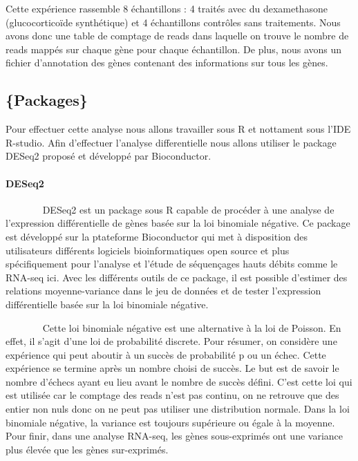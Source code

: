 \documentclass[
  12pt,
]{article}
\begin{document}
\par

Cette expérience rassemble 8 échantillons : 4 traités avec du
dexamethasone (glucocorticoïde synthétique) et 4 échantillons contrôles
sans traitements. Nous avons donc une table de comptage de reads dans
laquelle on trouve le nombre de reads mappés sur chaque gène pour chaque
échantillon. De plus, nous avons un fichier d'annotation des gènes
contenant des informations sur tous les gènes.

\hypertarget{packages}{%
\subsection{\texorpdfstring{\large\{Packages\}}{\{Packages\}}}\label{packages}}

Pour effectuer cette analyse nous allons travailler sous R et nottament
sous l'IDE R-studio. Afin d'effectuer l'analyse differentielle nous
allons utiliser le package DESeq2 proposé et développé par Bioconductor.

\newpage

\hypertarget{deseq2}{%
\paragraph{DESeq2}\label{deseq2}}

~~~~~~~ DESeq2 est un package sous R capable de procéder à une analyse
de l'expression différentielle de gènes basée sur la loi binomiale
négative. Ce package est développé sur la ptateforme Bioconductor qui
met à disposition des utilisateurs différents logiciels bioinformatiques
open source et plus spécifiquement pour l'analyse et l'étude de
séquençages hauts débits comme le RNA-seq ici. Avec les différents
outils de ce package, il est possible d'estimer des relations
moyenne-variance dans le jeu de données et de tester l'expression
différentielle basée sur la loi binomiale négative.

\par

~~~~~~~ Cette loi binomiale négative est une alternative à la loi de
Poisson. En effet, il s'agit d'une loi de probabilité discrete. Pour
résumer, on considère une expérience qui peut aboutir à un succès de
probabilité p ou un échec. Cette expérience se termine après un nombre
choisi de succès. Le but est de savoir le nombre d'échecs ayant eu lieu
avant le nombre de succès défini. C'est cette loi qui est utilisée car
le comptage des reads n'est pas continu, on ne retrouve que des entier
non nuls donc on ne peut pas utiliser une distribution normale. Dans la
loi binomiale négative, la variance est toujours supérieure ou égale à
la moyenne. Pour finir, dans une analyse RNA-seq, les gènes
sous-exprimés ont une variance plus élevée que les gènes sur-exprimés.
\end{document}
